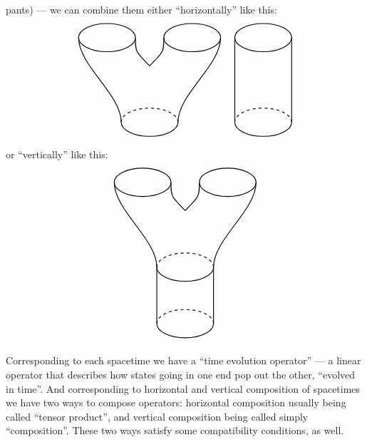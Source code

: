 \documentclass{article}
\begin{document}
pants) --- we can combine them either ``horizontally'' like this: \[
  \begin{tikzpicture}[scale=0.5]
    \begin{scope}[shift={(8,0)}]
      \draw[thick] (0,0) ellipse (2cm and 1cm);
      \draw[thick] (-2,0) to (-2,-6);
      \draw[thick] (2,0) to (2,-6);
      \begin{scope}[shift={(0,-6)}]
        \draw[thick,dashed] (0:2cm and 1cm) arc (0:180:2cm and 1cm);
        \draw[thick] (180:2cm and 1cm) arc (180:360:2cm and 1cm);
      \end{scope}
    \end{scope}
    \draw[thick] (-3,0) ellipse (2cm and 1cm);
    \draw[thick] (3,0) ellipse (2cm and 1cm);
    \draw[thick] (-5,0) .. controls (-5,-2) and (-2,-4) .. (-2,-6);
    \draw[thick] (5,0) .. controls (5,-2) and (2,-4) .. (2,-6);
    \draw[thick] (-1,0) .. controls (-1,-1) .. (0,-2);
    \draw[thick] (1,0) .. controls (1,-1) .. (0,-2);
    \begin{scope}[shift={(0,-6)}]
      \draw[thick,dashed] (0:2cm and 1cm) arc (0:180:2cm and 1cm);
      \draw[thick] (180:2cm and 1cm) arc (180:360:2cm and 1cm);
    \end{scope}
  \end{tikzpicture}
\] or ``vertically'' like this: \[
  \begin{tikzpicture}[scale=0.5]
    \draw[thick] (-3,0) ellipse (2cm and 1cm);
    \draw[thick] (3,0) ellipse (2cm and 1cm);
    \draw[thick] (-5,0) .. controls (-5,-2) and (-2,-4) .. (-2,-6);
    \draw[thick] (5,0) .. controls (5,-2) and (2,-4) .. (2,-6);
    \draw[thick] (-1,0) .. controls (-1,-1) .. (0,-2);
    \draw[thick] (1,0) .. controls (1,-1) .. (0,-2);
    \begin{scope}[shift={(0,-6)}]
      \draw[thick,dashed] (0:2cm and 1cm) arc (0:180:2cm and 1cm);
      \draw[thick] (180:2cm and 1cm) arc (180:360:2cm and 1cm);
    \end{scope}
    \draw[thick] (-2,-6) to (-2,-10);
    \draw[thick] (2,-6) to (2,-10);
    \begin{scope}[shift={(0,-10)}]
      \draw[thick,dashed] (0:2cm and 1cm) arc (0:180:2cm and 1cm);
      \draw[thick] (180:2cm and 1cm) arc (180:360:2cm and 1cm);
    \end{scope}
  \end{tikzpicture}
\]

Corresponding to each spacetime we have a ``time evolution operator''
--- a linear operator that describes how states going in one end pop out
the other, ``evolved in time''. And corresponding to horizontal and
vertical composition of spacetimes we have two ways to compose
operators: horizontal composition usually being called ``tensor
product'', and vertical composition being called simply ``composition''.
These two ways satisfy some compatibility conditions, as well.
\end{document}
